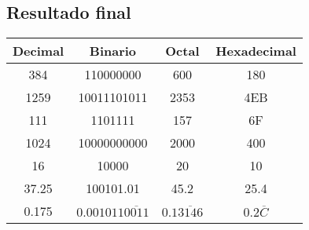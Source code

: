 \documentclass[12pt]{article}
\begin{document}
\subsection*{Resultado final}

\begin{center}
\begin{tabular}{|c|c|c|c|}
\hline
\textbf{Decimal} & \textbf{Binario} & \textbf{Octal} & \textbf{Hexadecimal} \\
\hline
384 & 110000000 & 600 & 180 \\
1259 & 10011101011 & 2353 & 4EB \\
111 & 1101111 & 157 & 6F \\
1024 & 10000000000 & 2000 & 400 \\
16 & 10000 & 20 & 10 \\
37.25 & 100101.01 & 45.2 & 25.4 \\
0.175 & \(0.001011\overline{0011}\) & \(0.1\overline{3146}\) & \(0.2\overline{C}\) \\
\hline
\end{tabular}
\end{center}
\end{document}
